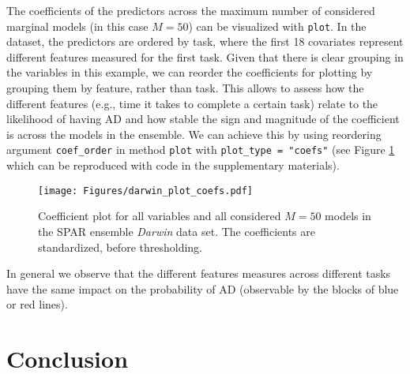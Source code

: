 \documentclass[
  article]{jss}
\begin{document}
The coefficients of the predictors across the maximum number of
considered marginal models (in this case \(M=50\)) can be visualized
with \texttt{plot}. In the dataset, the predictors are ordered by task,
where the first 18 covariates represent different features measured for
the first task. Given that there is clear grouping in the variables in
this example, we can reorder the coefficients for plotting by grouping
them by feature, rather than task. This allows to assess how the
different features (e.g., time it takes to complete a certain task)
relate to the likelihood of having AD and how stable the sign and
magnitude of the coefficient is across the models in the ensemble. We
can achieve this by using reordering argument \texttt{coef\_order} in
method \texttt{plot} with \texttt{plot\_type\ =\ "coefs"} (see Figure
\ref{fig:darwin_coefs} which can be reproduced with code in the
supplementary materials).

\begin{figure}[t!]
\centering
\texttt{[image: Figures/darwin\_plot\_coefs.pdf]}
\caption{Coefficient plot for all variables and all considered $M=50$ models in the SPAR ensemble
\emph{Darwin} data set. The coefficients are standardized, before thresholding. \label{fig:darwin_coefs}}
\end{figure}

In general we observe that the different features measures across
different tasks have the same impact on the probability of AD
(observable by the blocks of blue or red lines).

\section{Conclusion}\label{sec-conclusion}
\end{document}
